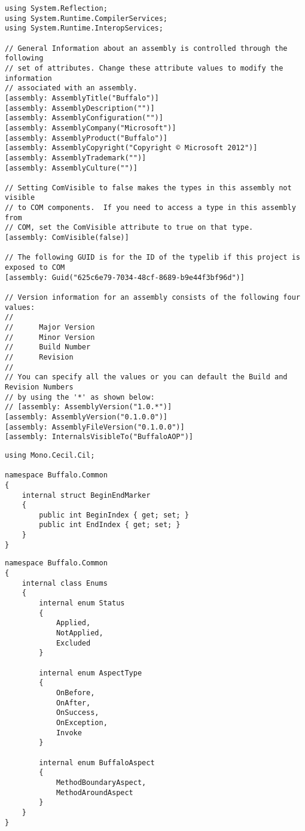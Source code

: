 \begin{lstlisting}[caption={../buffalo/Properties/AssemblyInfo.cs}, label=../buffalo/Properties/AssemblyInfo.cs, frame=tb, basicstyle=\scriptsize]﻿using System.Reflection;
using System.Runtime.CompilerServices;
using System.Runtime.InteropServices;

// General Information about an assembly is controlled through the following 
// set of attributes. Change these attribute values to modify the information
// associated with an assembly.
[assembly: AssemblyTitle("Buffalo")]
[assembly: AssemblyDescription("")]
[assembly: AssemblyConfiguration("")]
[assembly: AssemblyCompany("Microsoft")]
[assembly: AssemblyProduct("Buffalo")]
[assembly: AssemblyCopyright("Copyright © Microsoft 2012")]
[assembly: AssemblyTrademark("")]
[assembly: AssemblyCulture("")]

// Setting ComVisible to false makes the types in this assembly not visible 
// to COM components.  If you need to access a type in this assembly from 
// COM, set the ComVisible attribute to true on that type.
[assembly: ComVisible(false)]

// The following GUID is for the ID of the typelib if this project is exposed to COM
[assembly: Guid("625c6e79-7034-48cf-8689-b9e44f3bf96d")]

// Version information for an assembly consists of the following four values:
//
//      Major Version
//      Minor Version 
//      Build Number
//      Revision
//
// You can specify all the values or you can default the Build and Revision Numbers 
// by using the '*' as shown below:
// [assembly: AssemblyVersion("1.0.*")]
[assembly: AssemblyVersion("0.1.0.0")]
[assembly: AssemblyFileVersion("0.1.0.0")]
[assembly: InternalsVisibleTo("BuffaloAOP")]\end{lstlisting}

\begin{lstlisting}[caption={../buffalo/Common/BeginEndMarker.cs}, label=../buffalo/Common/BeginEndMarker.cs, frame=tb, basicstyle=\scriptsize]﻿using Mono.Cecil.Cil;

namespace Buffalo.Common
{
    internal struct BeginEndMarker
    {
        public int BeginIndex { get; set; }
        public int EndIndex { get; set; }
    }
}
\end{lstlisting}

\begin{lstlisting}[caption={../buffalo/Common/Enums.cs}, label=../buffalo/Common/Enums.cs, frame=tb, basicstyle=\scriptsize]﻿namespace Buffalo.Common
{
    internal class Enums
    {
        internal enum Status
        {
            Applied,
            NotApplied,
            Excluded
        }

        internal enum AspectType
        {
            OnBefore,
            OnAfter,
            OnSuccess,
            OnException,
            Invoke
        }

        internal enum BuffaloAspect
        {
            MethodBoundaryAspect,
            MethodAroundAspect
        }
    }
}
\end{lstlisting}

